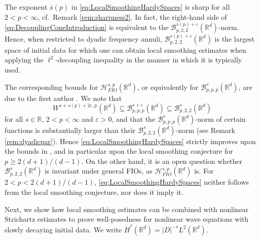 \documentclass{amsart}
\theoremstyle{definition}
\newcommand{\R}{\mathbb{R}}
\newcommand {\Rd}{\mathbb{R}^{d}}
\newcommand {\Hps}{\mathcal{H}^{s,p}_{FIO}(\Rd)}
\newcommand {\Ba}{\mathcal{B}}
\newcommand {\Basppp}{\mathcal{B}^{s}_{p,p,p}(\Rd)}
\newcommand {\veps}{\varepsilon}
\numberwithin{equation}{section}
\begin{document}
The exponent $\overline{s}(p)$ in \eqref{eq:LocalSmoothingHardySpaces} is sharp for all $2<p<\infty$, cf.~Remark \ref{rem:sharpness2}. In fact, the right-hand side of \eqref{eq:DecouplingConeIntroduction} is equivalent to the $\Ba^{\overline{s}(p)+\veps}_{p,2,2}(\Rd)$-norm. Hence, when restricted to dyadic frequency annuli, $\Ba^{\overline{s}(p)+\veps}_{p,2,2}(\Rd)$ is the largest space of initial data for which one can obtain local smoothing estimates when applying the $\ell^{2}$-decoupling inequality in the manner in which it is typically used. 

The corresponding bounds for $\Hps$, or equivalently for $\Basppp$, are due to the first author \cite{Rozendaal2021LocalSmoothing}. We note that
\begin{equation}
\label{eq:EmbeddingRefinement}
W^{s+s(p)+2\veps,p}(\Rd)\subseteq \mathcal{B}^{s+\varepsilon}_{p,p,p}(\Rd) \subseteq \mathcal{B}^{s}_{p,2,2}(\Rd)
\end{equation}
for all $s\in\R$, $2<p<\infty$ and $\veps>0$, and that the $\Ba^{s}_{p,p,p}(\Rd)$-norm of certain functions is substantially larger than their $\Ba^{s}_{p,2,2}(\Rd)$-norm (see Remark \ref{rem:dyadicpar}). Hence \eqref{eq:LocalSmoothingHardySpaces} strictly improves upon the bounds in \cite{Rozendaal2021LocalSmoothing}, and in particular upon the local smoothing conjecture for $p\geq 2(d+1)/(d-1)$. On the other hand, it is an open question whether $\Ba^{s}_{p,2,2}(\Rd)$ is invariant under general FIOs, as $\Hps$ is. For $2<p<2(d+1)/(d-1)$, \eqref{eq:LocalSmoothingHardySpaces} neither follows from the local smoothing conjecture, nor does it imply it.



Next, we show how local smoothing estimates can be combined with nonlinear Strichartz estimates to prove well-posedness for nonlinear wave equations with slowly decaying initial data. We write $\dot{H}^s(\R^d) = |D|^{-s} L^2(\R^d)$.
\end{document}
